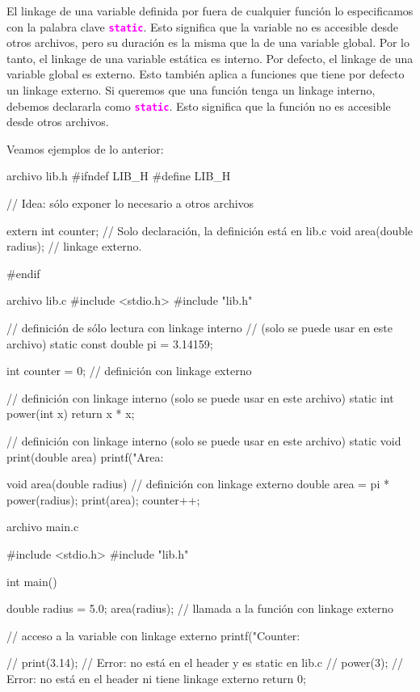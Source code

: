 \documentclass[]{scrartcl}
\newcommand{\hl}[1]{\textcolor{magenta}{\textbf{\texttt{#1}}}}
\begin{document}
\newpage
El linkage de una variable definida por fuera de cualquier función lo especificamos con la palabra clave \hl{static}. Esto significa que la variable no es accesible desde otros archivos, pero su duración es la misma que la de una variable global. Por lo tanto, el linkage de una variable estática es interno. Por defecto, el linkage de una variable global es externo.
Esto también aplica a funciones que tiene por defecto un linkage externo. Si queremos que una función tenga un linkage interno, debemos declararla como \hl{static}. Esto significa que la función no es accesible desde otros archivos.

Veamos ejemplos de lo anterior:

\begin{cbox}[]{archivo lib.h} 
  #ifndef LIB_H
  #define LIB_H
  
  // Idea: sólo exponer lo necesario a otros archivos

  extern int counter;        // Solo declaración, la definición está en lib.c
  void area(double radius);  // linkage externo. 
  
  #endif
\end{cbox}


\begin{cbox}[]{archivo lib.c}
  #include <stdio.h>
  #include "lib.h"

  // definición  de sólo lectura con linkage interno
  // (solo se puede usar en este archivo)
  static const double pi = 3.14159; 

  int counter = 0; // definición con linkage externo
  
  // definición con linkage interno (solo se puede usar en este archivo)
  static int power(int x) { 
      return x * x;
  }

  // definición con linkage interno (solo se puede usar en este archivo)
  static void print(double area){  
    printf("Area: %
  }
  
  void area(double radius) { // definición con linkage externo 
      double area = pi * power(radius);
      print(area);
      counter++;
  }
\end{cbox}

\begin{cbox}[]{archivo main.c}
  
  #include <stdio.h>
  #include "lib.h"

  int main() {
      double radius = 5.0;
      area(radius); // llamada a la función con linkage externo

      // acceso a la variable con linkage externo
      printf("Counter: %

      // print(3.14); // Error: no está en el header y es static en lib.c
      // power(3);    // Error: no está en el header ni tiene linkage externo
      return 0;
  }
\end{cbox}
\end{document}
